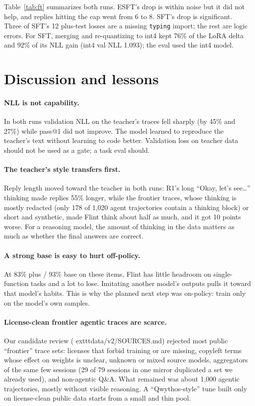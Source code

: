 \documentclass[11pt]{article}
\begin{document}
Table~\ref{tab:ft} summarizes both runs. ESFT's drop is within noise but it did not help, and replies hitting the cap
went from 6 to 8. SFT's drop is significant. Three of SFT's 12 plus-test losses are a missing \texttt{typing} import; the
rest are logic errors. For SFT, merging and re-quantizing to int4 kept 76\% of the LoRA delta and 92\% of its NLL gain
(int4 val NLL 1.093); the eval used the int4 model.

\section{Discussion and lessons}

\paragraph{NLL is not capability.} In both runs validation NLL on the teacher's traces fell sharply (by 45\% and 27\%)
while pass@1 did not improve. The model learned to reproduce the teacher's text without learning to code better.
Validation loss on teacher data should not be used as a gate; a task eval should.

\paragraph{The teacher's style transfers first.} Reply length moved toward the teacher in both runs: R1's long
``Okay, let's see\ldots'' thinking made replies 55\% longer, while the frontier traces, whose thinking is mostly redacted
(only 178 of 1,020 agent trajectories contain a thinking block) or short and synthetic, made Flint think about half as
much, and it got 10 points worse. For a reasoning model, the amount of thinking in the data matters as much as whether
the final answers are correct.

\paragraph{A strong base is easy to hurt off-policy.} At 83\% plus / 93\% base on these items, Flint has little headroom
on single-function tasks and a lot to lose. Imitating another model's outputs pulls it toward that model's habits. This
is why the planned next step was on-policy: train only on the model's own samples.

\paragraph{License-clean frontier agentic traces are scarce.} Our candidate review (	exttt{data/\allowbreak v2/\allowbreak SOURCES.md}) rejected
most public ``frontier'' trace sets: licenses that forbid training or are missing, copyleft terms whose effect on weights
is unclear, unknown or mixed source models, aggregators of the same few sessions (29 of 79 sessions in one mirror duplicated
a set we already used), and non-agentic Q\&A. What remained was about 1,000 agentic trajectories, mostly without visible reasoning.
A ``Qwythos-style'' tune built only on license-clean public data starts from a small and thin pool.
\end{document}
